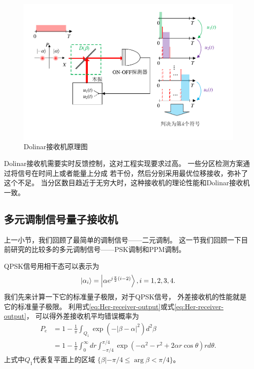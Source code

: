\begin{figure}
\centering
  \includegraphics[width=\textwidth]{figures/chap2/Dolinar-receiver}
  \caption{Dolinar接收机原理图}
  \label{fig:Dolinar-receiver}
\end{figure}

Dolinar接收机需要实时反馈控制，这对工程实现要求过高。
一些分区检测方案通过将信号在时间上或者能量上分成
若干份，然后分别采用最优位移接收，弥补了这个不足\cite{vilnrotter2012quantum,li2013optimal,sych2014optimal}。
当分区数目趋近于无穷大时，这种接收机的理论性能和Dolinar接收机一致\cite{sych2014optimal}。

\subsection{多元调制信号量子接收机}
上一小节，我们回顾了最简单的调制信号——二元调制。
这一节我们回顾一下目前研究的比较多的多元调制信号——PSK调制和PPM调制。

QPSK信号用相干态可以表示为
\begin{equation}
\ket{\alpha_i} = \ket{\alpha e^{j \frac{\pi}{2} (i-2)}},i=1,2,3,4.
\end{equation}
我们先来计算一下它的标准量子极限，对于QPSK信号，
外差接收机的性能就是它的标准量子极限。
利用式\ref{eq:Her-receiver-output}或式\ref{eq:Her-receiver-output}，
可以得外差接收机平均错误概率为\cite{helstrom1976quantum,kato1999quantum}
\begin{equation}
\begin{split}
P_e &= 1 - \frac{1}{\pi}\int_{Q_1} \exp(-|\beta-\alpha|^2) d^2 \beta \\
    &= 1 - \frac{1}{\pi}\int_0^{\infty} dr \int_{-\pi/4}^{\pi/4} \exp(-\alpha^2 - r^2 + 2\alpha r \cos \theta) r d\theta .
\end{split}
\end{equation}
上式中$Q_1$代表复平面上的区域 $\{\beta|-\pi/4 \le \arg \beta < \pi/4\}$。

